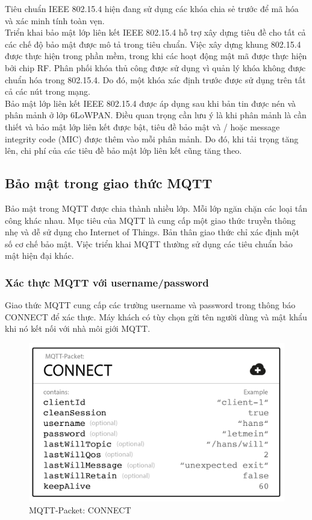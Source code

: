 \documentclass{report}
\begin{document}
Tiêu chuẩn IEEE 802.15.4 hiện đang sử dụng các khóa chia sẻ trước để mã hóa và xác minh tính toàn vẹn. \\

Triển khai bảo mật lớp liên kết IEEE 802.15.4 hỗ trợ xây dựng tiêu đề cho tất cả các chế độ bảo mật được mô tả trong tiêu chuẩn. Việc xây dựng khung 802.15.4 được thực hiện trong phần mềm, trong khi các hoạt động mật mã được thực hiện bởi chip RF. Phân phối khóa thủ công được sử dụng vì quản lý khóa không được chuẩn hóa trong 802.15.4. Do đó, một khóa xác định trước được sử dụng trên tất cả các nút trong mạng. \\

Bảo mật lớp liên kết IEEE 802.15.4 được áp dụng sau khi bản tin được nén và phân mảnh ở lớp 6LoWPAN. Điều quan trọng cần lưu ý là khi phân mảnh là cần thiết và bảo mật lớp liên kết được bật, tiêu đề bảo mật và / hoặc message integrity code  (MIC) được thêm vào mỗi phân mảnh. Do đó, khi tải trọng tăng lên, chi phí của các tiêu đề bảo mật lớp liên kết cũng tăng theo. 

\subsection{Bảo mật trong giao thức MQTT}
Bảo mật trong MQTT được chia thành nhiều lớp. Mỗi lớp ngăn chặn các loại tấn công khác nhau. Mục tiêu của MQTT là cung cấp một giao thức truyền thông nhẹ và dễ sử dụng cho Internet of Things. Bản thân giao thức chỉ xác định một số cơ chế bảo mật. Việc triển khai MQTT thường sử dụng các tiêu chuẩn bảo mật hiện đại khác.
\subsubsection{Xác thực MQTT với username/password}
Giao thức MQTT cung cấp các trường username và password trong thông báo CONNECT để xác thực. Máy khách có tùy chọn gửi tên người dùng và mật khẩu khi nó kết nối với nhà môi giới MQTT.

\begin{figure}[h]
	\centering
	\includegraphics[scale = 0.7]{fig53.png}
	\caption{MQTT-Packet: CONNECT}
	\label{fig:Graph53}
\end{figure}
\end{document}
